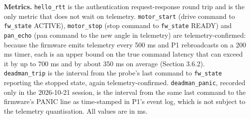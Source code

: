 \textbf{Metrics.} \texttt{hello\_rtt} is the authentication request-response round trip and is the only metric that does not wait on telemetry. \texttt{motor\_start} (drive command to \texttt{fw\_state} ACTIVE), \texttt{motor\_stop} (stop command to \texttt{fw\_state} READY) and \texttt{pan\_echo} (pan command to the new angle in telemetry) are telemetry-confirmed: because the firmware emits telemetry every 500 ms and P1 rebroadcasts on a 200 ms timer, each is an upper bound on the true command latency that can exceed it by up to 700 ms and by about 350 ms on average (Section 3.6.2). \texttt{deadman\_trip} is the interval from the probe's last command to \texttt{fw\_state} reporting the stopped state, again telemetry-confirmed. \texttt{deadman\_panic}, recorded only in the 2026-10-21 session, is the interval from the same last command to the firmware's PANIC line as time-stamped in P1's event log, which is not subject to the telemetry quantisation. All values are in ms.


